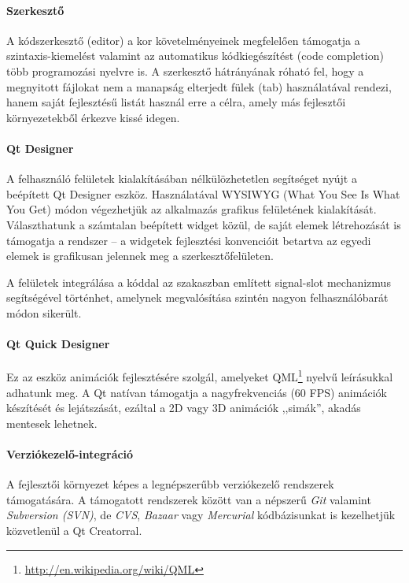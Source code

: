 \paragraph{Szerkesztő}

A kódszerkesztő (editor) a kor követelményeinek megfelelően támogatja a szintaxis-kiemelést valamint az automatikus kódkiegészítést (code completion) több programozási nyelvre is. A szerkesztő hátrányának róható fel, hogy a megnyitott fájlokat nem a manapság elterjedt fülek (tab) használatával rendezi, hanem saját fejlesztésű listát használ erre a célra, amely más fejlesztői környezetekből érkezve kissé idegen.

\paragraph{Qt Designer}

A felhasználó felületek kialakításában nélkülözhetetlen segítséget nyújt a beépített Qt Designer eszköz. Használatával WYSIWYG (What You See Is What You Get) módon végezhetjük az alkalmazás grafikus felületének kialakítását. Választhatunk a számtalan beépített widget közül, de saját elemek létrehozását is támogatja a rendszer -- a widgetek fejlesztési konvencióit betartva az egyedi elemek is grafikusan jelennek meg a szerkesztőfelületen.

A felületek integrálása a kóddal az  szakaszban említett signal-slot mechanizmus segítségével történhet, amelynek megvalósítása szintén nagyon felhasználóbarát módon sikerült.

\paragraph{Qt Quick Designer}

Ez az eszköz animációk fejlesztésére szolgál, amelyeket QML\footnote{\url{http://en.wikipedia.org/wiki/QML}} nyelvű leírásukkal adhatunk meg. A Qt natívan támogatja a nagyfrekvenciás (60 FPS) animációk készítését és lejátszását, ezáltal a 2D vagy 3D animációk ,,simák'', akadás mentesek lehetnek.

\paragraph{Verziókezelő-integráció}

A fejlesztői környezet képes a legnépszerűbb verziókezelő rendszerek támogatására. A támogatott rendszerek között van a népszerű \emph{Git} valamint \emph{Subversion (SVN)}, de \emph{CVS}, \emph{Bazaar} vagy \emph{Mercurial} kódbázisunkat is kezelhetjük közvetlenül a Qt Creatorral.

